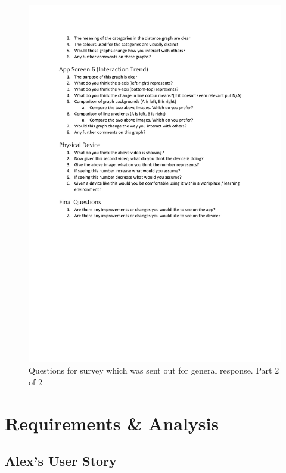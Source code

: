 \documentclass{l4proj}
\begin{document}
\begin{appendices}
    \begin{figure}[!htb]
        \centering
        \includegraphics[width=1.0\linewidth]{images/non-contact_survey_questions 2.pdf}

        \caption{ Questions for survey which was sent out for general response. Part 2 of 2 }

        \label{fig:non-contact-survey-questions-2}
    \end{figure}

    \chapter{Requirements \& Analysis}

    \section{Alex's User Story}


\end{appendices}
\end{document}
